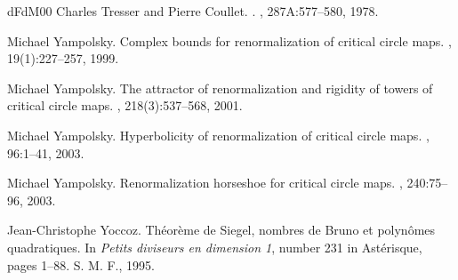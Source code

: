 \documentclass{amsart}
\begin{document}
\begin{thebibliography}{dFdM00}
Charles Tresser and Pierre Coullet.
.
, 287A:577--580, 1978.

Michael Yampolsky.
\newblock Complex bounds for renormalization of critical circle maps.
, 19(1):227--257, 1999.

Michael Yampolsky.
\newblock The attractor of renormalization and rigidity of towers of critical circle maps.
, 218(3):537--568, 2001.

Michael Yampolsky.
\newblock Hyperbolicity of renormalization of critical circle maps.
, 96:1--41, 2003.

Michael Yampolsky.
\newblock Renormalization horseshoe for critical circle maps.
, 240:75--96, 2003.

Jean-Christophe Yoccoz.
\newblock Th\'eor\`eme de {Siegel,} nombres de {Bruno} et polyn\^omes quadratiques.
\newblock In {\em Petits diviseurs en dimension 1}, number 231 in Ast\'erisque, pages 1--88. S. M. F., 1995.

\end{thebibliography}
\end{document}

